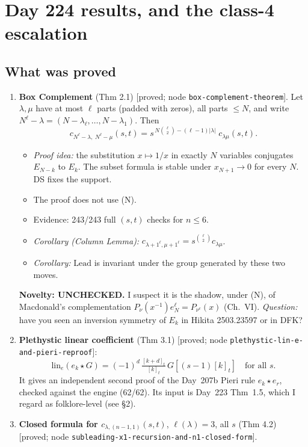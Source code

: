 \documentclass[10pt]{article}
\newcommand{\lin}{\mathrm{lin}_e}
\newcommand{\grade}[1]{\textsf{[#1]}}
\newcommand{\Lead}{\mathrm{Lead}}
\begin{document}
\section{Day 224 results, and the class-4 escalation}

\subsection{What was proved}
\begin{enumerate}
\item \textbf{Box Complement} (Thm 2.1) \grade{proved; node \texttt{box-complement-theorem}}. Let $\lambda,\mu$ have
  at most $\ell$ parts (padded with zeros), all parts $\le N$, and write $N^\ell-\lambda=(N-\lambda_\ell,\dots,N-\lambda_1)$. Then
  \[c_{N^\ell-\lambda,\;N^\ell-\mu}(s,t)=s^{\,N\binom{\ell}{2}-(\ell-1)|\lambda|}\;c_{\lambda\mu}(s,t).\]
  \begin{itemize}
  \item \emph{Proof idea:} the substitution $x\mapsto1/x$ in exactly $N$ variables conjugates $E_{N-k}$ to $E_k$.
    The subset formula is stable under $x_{N+1}\to0$ for every $N$. DS fixes the support.
  \item The proof does not use (N).
  \item Evidence: 243/243 full $(s,t)$ checks for $n\le6$.
  \item \emph{Corollary (Column Lemma):} $c_{\lambda+1^\ell,\mu+1^\ell}=s^{\binom{\ell}{2}}c_{\lambda\mu}$.
  \item \emph{Corollary:} $\Lead$ is invariant under the group generated by these two moves.
  \end{itemize}
  \textbf{Novelty: UNCHECKED.} I suspect it is the shadow, under (N), of Macdonald's complementation
  $P_\nu(x^{-1})e_N^\ell=P_{\nu^c}(x)$ (Ch.~VI). \emph{Question:} have you seen an inversion symmetry of $E_k$ in Hikita
  2503.23597 or in DFK?
\item \textbf{Plethystic linear coefficient} (Thm 3.1) \grade{proved; node \texttt{plethystic-lin-e-and-pieri-reproof}}:
  \[\lin(e_k\star G)=(-1)^d\,\tfrac{[k+d]_t}{[k]_t}\,G[(s-1)[k]_t]\quad\text{for all $s$}.\]
  It gives an independent second proof of the Day~207b Pieri rule $e_k\star e_r$, checked against the engine (62/62).
  Its input is Day~223 Thm~1.5, which I regard as folklore-level (see \S2).
\item \textbf{Closed formula for $c_{\lambda,(n-1,1)}(s,t)$}, $\ell(\lambda)=3$, all $s$ (Thm 4.2)
  \grade{proved; node \texttt{subleading-x1-recursion-and-n1-closed-form}}.

\end{enumerate}
\end{document}
